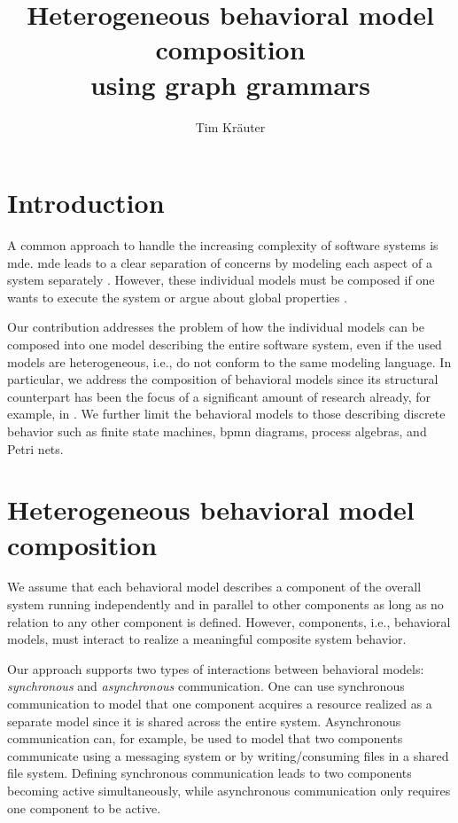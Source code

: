 \documentclass[a4paper]{easychair}
\title{Heterogeneous behavioral model composition \\
        using graph grammars}
\author{
Tim Kräuter
}
\institute{
  Høgskulen på Vestlandet\\
  Bergen, Norway\\
  \email{tkra@hvl.no}
 }
\begin{document}
\maketitle

\section{Introduction}
A common approach to handle the increasing complexity of software systems is \gls{mde}.
\gls{mde} leads to a clear separation of concerns by modeling each aspect of a system separately \cite{franceModeldrivenDevelopmentComplex2007}.
However, these individual models must be composed if one wants to execute the system or argue about global properties \cite{kienzleUnifyingFrameworkHomogeneous2019}.

Our contribution addresses the problem of how the individual models can be composed into one model describing the entire software system, even if the used models are heterogeneous, i.e., do not conform to the same modeling language.
In particular, we address the composition of behavioral models since its structural counterpart has been the focus of a significant amount of research already, for example, in \cite{kienzleUnifyingFrameworkHomogeneous2019, klareCommonalitiesPreservingConsistency2019, stunkelComprehensiveSystemsFormal2021}.
We further limit the behavioral models to those describing discrete behavior such as finite state machines, \gls{bpmn} diagrams, process algebras, and Petri nets. %

\section{Heterogeneous behavioral model composition}
We assume that each behavioral model describes a component of the overall system running independently and in parallel to other components as long as no relation to any other component is defined.
However, components, i.e., behavioral models, must interact to realize a meaningful composite system behavior.

Our approach supports two types of interactions between behavioral models: \textit{synchronous} and \textit{asynchronous} communication.
One can use synchronous communication to model that one component acquires a resource realized as a separate model since it is shared across the entire system.
Asynchronous communication can, for example, be used to model that two components communicate using a messaging system or by writing/consuming files in a shared file system.
Defining synchronous communication leads to two components becoming active simultaneously, while asynchronous communication only requires one component to be active. 
\end{document}
